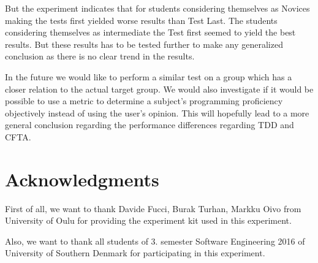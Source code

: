 \documentclass{sig-alternate-05-2015}
\begin{document}
But the experiment indicates that for students considering themselves as Novices making the tests first yielded worse results than Test Last. The students considering themselves as intermediate the Test first seemed to yield the best results. But these results has to be tested further to make any generalized conclusion as there is no clear trend in the results.

In the future we would like to perform a similar test on a group which has a closer relation to the actual target group. We would also investigate if it would be possible to use a metric to determine a subject's programming proficiency objectively instead of using the user's opinion. This will hopefully lead to a more general conclusion regarding the performance differences regarding TDD and CFTA.




\section{Acknowledgments}

First of all, we want to thank Davide Fucci, Burak Turhan, Markku Oivo from University of Oulu for providing the experiment kit used in this experiment.

Also, we want to thank all students of 3. semester Software Engineering 2016 of University of Southern Denmark for participating in this experiment.
\end{document}
